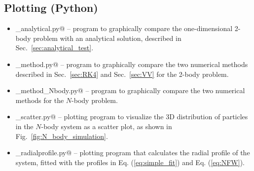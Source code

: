 \documentclass{article}
\begin{document}
\begin{multicols}{2}
\subsection{Plotting (Python)}

\begin{itemize}
	\item \verb@plotting_analytical.py@ -- program to graphically compare the one-dimensional 2-body problem with an analytical solution, described in Sec.~\ref{sec:analytical_test}.
	\item \verb@plot_method.py@ -- program to graphically compare the two numerical methods described in Sec.~\ref{sec:RK4} and Sec.~\ref{sec:VV} for the 2-body problem.
	\item \verb@plot_method_Nbody.py@ -- program to graphically compare the two numerical methods for the $N$-body problem.
	\item \verb@plotting_scatter.py@ -- plotting program to visualize the 3D distribution of particles in the $N$-body system as a scatter plot, as shown in Fig.~\ref{fig:N_body_simulation}. 
	\item \verb@plotting_radialprofile.py@ -- plotting program that calculates the radial profile of the system, fitted with the profiles in Eq. (\ref{eq:simple_fit}) and Eq. (\ref{eq:NFW}).
\end{itemize}




\end{multicols}
\end{document}
